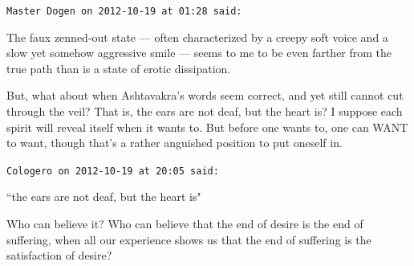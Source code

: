 \begin{footnotesize}\begin{sffamily}



\texttt{Master Dogen on 2012-10-19 at 01:28 said: }

The faux zenned-out state — often characterized by a creepy soft voice and a slow yet somehow
aggressive smile — seems to me to be even farther from the true path than is a state of erotic
dissipation. 

But, what about when Ashtavakra's words seem correct, and yet still cannot cut through the veil?
That is, the ears are not deaf, but the heart is? I suppose each spirit will reveal itself when it wants to. But before
one wants to, one can WANT to want, though that's a rather anguished position to put oneself in.


\hfill

\texttt{Cologero on 2012-10-19 at 20:05 said: }

``the ears are not deaf, but the heart is"

Who can believe it? Who can believe that the end of desire is the end of suffering, when all our experience shows us
that the end of suffering is the satisfaction of desire?


\end{sffamily}\end{footnotesize}
